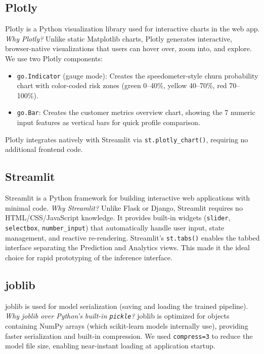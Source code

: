 \documentclass[12pt, a4paper]{article}
\begin{document}
\subsection{Plotly}

Plotly is a Python visualization library used for interactive charts in the web app. \textit{Why Plotly?} Unlike static Matplotlib charts, Plotly generates interactive, browser-native visualizations that users can hover over, zoom into, and explore. We use two Plotly components:
\begin{itemize}
    \item \texttt{go.Indicator} (gauge mode): Creates the speedometer-style churn probability chart with color-coded risk zones (green 0--40\%, yellow 40--70\%, red 70--100\%).
    \item \texttt{go.Bar}: Creates the customer metrics overview chart, showing the 7 numeric input features as vertical bars for quick profile comparison.
\end{itemize}
Plotly integrates natively with Streamlit via \texttt{st.plotly\_chart()}, requiring no additional frontend code.

\subsection{Streamlit}

Streamlit is a Python framework for building interactive web applications with minimal code. \textit{Why Streamlit?} Unlike Flask or Django, Streamlit requires no HTML/CSS/JavaScript knowledge. It provides built-in widgets (\texttt{slider}, \texttt{selectbox}, \texttt{number\_input}) that automatically handle user input, state management, and reactive re-rendering. Streamlit's \texttt{st.tabs()} enables the tabbed interface separating the Prediction and Analytics views. This made it the ideal choice for rapid prototyping of the inference interface.

\subsection{joblib}

joblib is used for model serialization (saving and loading the trained pipeline). \textit{Why joblib over Python's built-in \texttt{pickle}?} joblib is optimized for objects containing NumPy arrays (which scikit-learn models internally use), providing faster serialization and built-in compression. We used \texttt{compress=3} to reduce the model file size, enabling near-instant loading at application startup.
\end{document}
